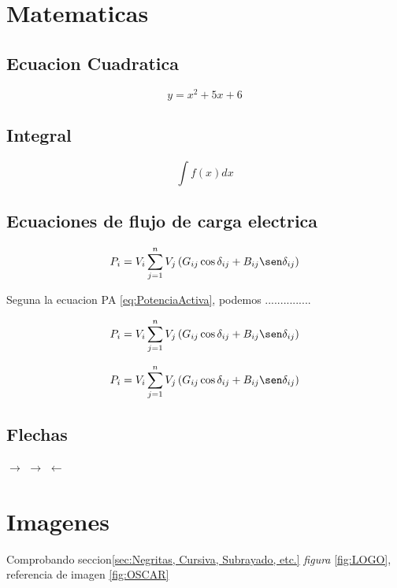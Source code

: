\documentclass[12pt, letterpaper]{article} %
\begin{document}
	\section{Matematicas}\label{sec:Matematicas}
		
		\subsection{Ecuacion Cuadratica}
	
			$$y = x^2+5x+6$$
		
		\subsection{Integral}
		
			$$\int f(x) dx$$
			
		\subsection{Ecuaciones de flujo de carga electrica}
			
			$$ P_i =  V_i \sum_{j=1}^{n} V_j \left( G_{ij} \cos\delta_{ij}+B_{ij} \sen\delta_{ij} \right) $$
			
			Seguna la ecuacion PA \ref{eq:PotenciaActiva}, podemos ...............			
			
			\begin{equation}\label{eq:PotenciaActiva}
				P_i =  V_i \sum_{j=1}^{n} V_j \left( G_{ij} \cos\delta_{ij}+B_{ij} \sen\delta_{ij} \right)
			\end{equation}

			\begin{equation}\label{eq:PotenciaActiv}
				P_i =  V_i \sum_{j=1}^{n} V_j \left( G_{ij} \cos\delta_{ij}+B_{ij} \sen\delta_{ij} \right)
			\end{equation}
			
		\subsection{Flechas}
			
			$ \rightarrow $
			$ \longrightarrow $
			$ \leftarrow $
			
		
	\section{Imagenes}\label{sec:Imagenes}
	
		Comprobando seccion\ref{sec:Negritas, Cursiva, Subrayado, etc.}   \textit{figura} \ref{fig:LOGO}, referencia de imagen \ref{fig:OSCAR} %
	
\end{document}
